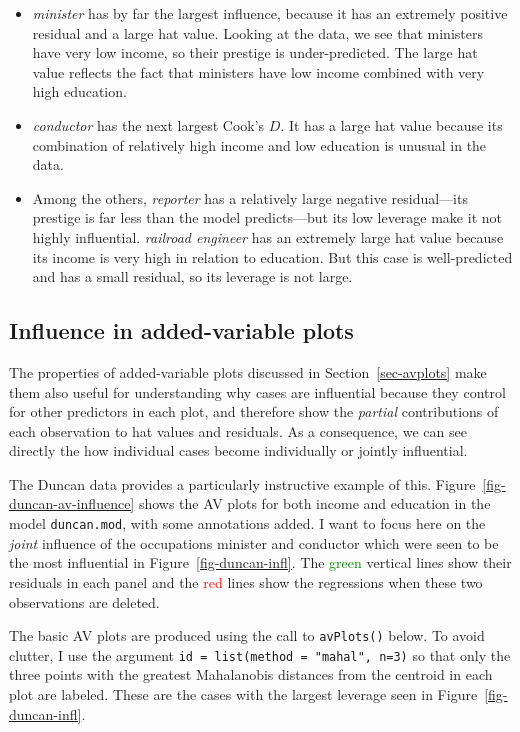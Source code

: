 \documentclass[
  letterpaper,
  10pt,
  krantz2]{krantz}
\begin{document}
\begin{itemize}
\item
  \emph{minister} has by far the largest influence, because it has an
  extremely positive residual and a large hat value. Looking at the
  data, we see that ministers have very low income, so their prestige is
  under-predicted. The large hat value reflects the fact that ministers
  have low income combined with very high education.
\item
  \emph{conductor} has the next largest Cook's \(D\). It has a large hat
  value because its combination of relatively high income and low
  education is unusual in the data.
\item
  Among the others, \emph{reporter} has a relatively large negative
  residual---its prestige is far less than the model predicts---but its
  low leverage make it not highly influential. \emph{railroad engineer}
  has an extremely large hat value because its income is very high in
  relation to education. But this case is well-predicted and has a small
  residual, so its leverage is not large.
\end{itemize}

\subsection{Influence in added-variable
plots}\label{influence-in-added-variable-plots}

The properties of added-variable plots discussed in
Section~\ref{sec-avplots} make them also useful for understanding why
cases are influential because they control for other predictors in each
plot, and therefore show the \emph{partial} contributions of each
observation to hat values and residuals. As a consequence, we can see
directly the how individual cases become individually or jointly
influential.

The Duncan data provides a particularly instructive example of this.
Figure~\ref{fig-duncan-av-influence} shows the AV plots for both income
and education in the model \texttt{duncan.mod}, with some annotations
added. I want to focus here on the \emph{joint} influence of the
occupations minister and conductor which were seen to be the most
influential in Figure~\ref{fig-duncan-infl}. The
\textcolor{green}{green} vertical lines show their residuals in each
panel and the \textcolor{red}{red} lines show the regressions when these
two observations are deleted.

The basic AV plots are produced using the call to \texttt{avPlots()}
below. To avoid clutter, I use the argument
\texttt{id\ =\ list(method\ =\ "mahal",\ n=3)} so that only the three
points with the greatest Mahalanobis distances from the centroid in each
plot are labeled. These are the cases with the largest leverage seen in
Figure~\ref{fig-duncan-infl}.
\end{document}

